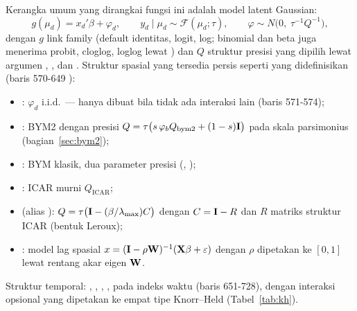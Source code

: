 Kerangka umum yang dirangkai fungsi ini adalah model latent Gaussian:
\begin{equation}
  g(\mu_d)=x_d'\beta+\varphi_d,\qquad
  y_d\mid\mu_d\sim\mathcal F(\mu_d;\tau),\qquad
  \varphi\sim N\bigl(0,\;\tau^{-1}Q^{-1}\bigr),
  \label{eq:hbarea-model}
\end{equation}
dengan $g$ link family (default identitas, logit, log; binomial dan beta juga
menerima probit, cloglog, loglog lewat ) dan $Q$ struktur
presisi yang dipilih lewat argumen , , dan
. Struktur spasial yang tersedia persis seperti yang
didefinisikan  (baris 570-649 ):
\begin{itemize}
  \item {}: $\varphi_d$ i.i.d.\ --- hanya dibuat bila tidak ada
        interaksi lain (baris 571-574);
  \item {}: BYM2 dengan presisi $Q=\tau\bigl(s\,\varphi_b Q_{\text{bym2}}+
        (1-s)\mathbf{I}\bigr)$ pada skala parsimonius (bagian~\ref{sec:bym2});
  \item {}: BYM klasik, dua parameter presisi
        (, );
  \item {}: ICAR murni $Q_{\text{ICAR}}$;
  \item {} (alias ): $Q=\tau\bigl(\mathbf{I}-(\beta/\lambda_{\max})C\bigr)$
        dengan $C=\mathbf{I}-R$ dan $R$ matriks struktur ICAR (bentuk Leroux);
  \item {}: model lag spasial $x=(\mathbf{I}-\rho\mathbf{W})^{-1}
        (\mathbf{X}\beta+\varepsilon)$ dengan $\rho$ dipetakan ke $[0,1]$ lewat
        rentang akar eigen $\mathbf{W}$.
\end{itemize}
Struktur temporal: , , , ,
 pada indeks waktu  (baris 651-728), dengan
interaksi opsional yang dipetakan ke empat tipe Knorr--Held
(Tabel~\ref{tab:kh}).

